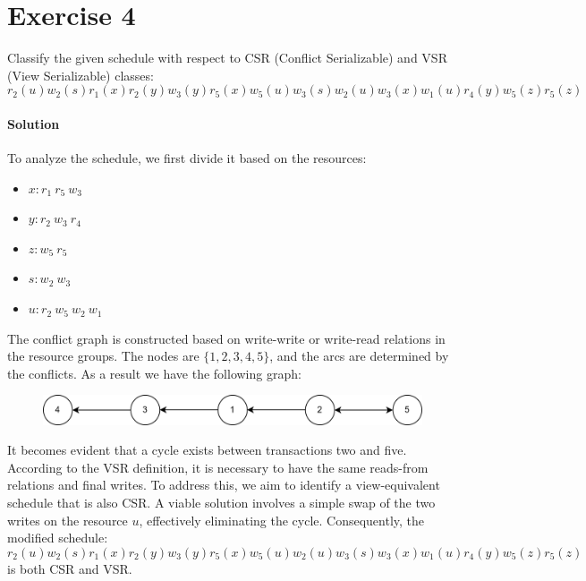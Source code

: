 \section{Exercise 4}

Classify the given schedule with respect to CSR (Conflict Serializable) and VSR (View Serializable) classes:
\[r_2(u) w_2(s) r_1(x) r_2(y) w_3(y) r_5(x) w_5(u) w_3(s)w_2(u) w_3(x) w_1(u) r_4(y) w_5(z) r_5(z)\]

\paragraph*{Solution}
To analyze the schedule, we first divide it based on the resources:
\begin{itemize}
    \item $x: r_1 \: r_5 \:w_3$
    \item $y: r_2 \: w_3 \:r_4$
    \item $z: w_5 \: r_5$
    \item $s: w_2 \: w_3$
    \item $u: r_2 \: w_5 \: w_2 \:w_1$
\end{itemize}
The conflict graph is constructed based on write-write or write-read relations in the resource groups. 
The nodes are $\{1,2,3,4,5\}$, and the arcs are determined by the conflicts. 
As a result we have the following graph:
\begin{figure}[H]
    \centering
    \includegraphics[width=1.0\linewidth]{images/conflictgraph1.png}
\end{figure}
It becomes evident that a cycle exists between transactions two and five. 
According to the VSR definition, it is necessary to have the same reads-from relations and final writes.
To address this, we aim to identify a view-equivalent schedule that is also CSR. 
A viable solution involves a simple swap of the two writes on the resource $u$, effectively eliminating the cycle. 
Consequently, the modified schedule:
\[r_2(u) w_2(s) r_1(x) r_2(y) w_3(y) r_5(x) w_5(u) w_2(u) w_3(s) w_3(x) w_1(u) r_4(y) w_5(z) r_5(z)\]
is both CSR and VSR.